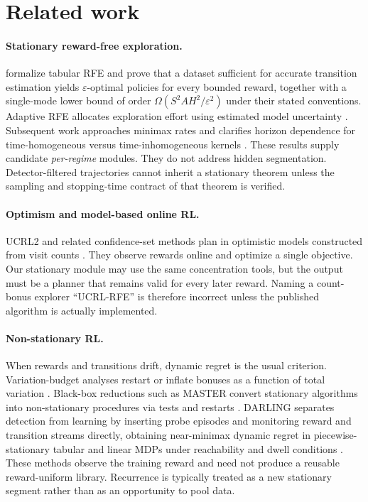 \documentclass[11pt]{article}
\newcommand{\eps}{\varepsilon}
\begin{document}
\section{Related work}
\label{sec:related}

\paragraph{Stationary reward-free exploration.}
\citet{jin2020rewardfree} formalize tabular RFE and prove that a dataset
sufficient for accurate transition estimation yields $\eps$-optimal policies
for every bounded reward, together with a single-mode lower bound of order
$\Omega(S^2AH^2/\eps^2)$ under their stated conventions. Adaptive RFE
allocates exploration effort using estimated model uncertainty
\citep{kaufmann2021adaptive}. Subsequent work approaches minimax rates and
clarifies horizon dependence for time-homogeneous versus time-inhomogeneous
kernels \citep{zhang2021nearly,menard2021fast}. These results supply candidate
\emph{per-regime} modules. They do not address hidden segmentation.
Detector-filtered trajectories cannot inherit a stationary theorem unless the
sampling and stopping-time contract of that theorem is verified.

\paragraph{Optimism and model-based online RL.}
UCRL2 and related confidence-set methods plan in optimistic models constructed
from visit counts \citep{jaksch2010near,azar2017minimax,dann2017unifying}.
They observe rewards online and optimize a single objective. Our stationary
module may use the same concentration tools, but the output must be a planner
that remains valid for every later reward. Naming a count-bonus explorer
``UCRL-RFE'' is therefore incorrect unless the published algorithm is actually
implemented.

\paragraph{Non-stationary RL.}
When rewards and transitions drift, dynamic regret is the usual criterion.
Variation-budget analyses restart or inflate bonuses as a function of total
variation \citep{cheung2020nonstationary,ortner2020variational}. Black-box
reductions such as MASTER convert stationary algorithms into non-stationary
procedures via tests and restarts \citep{wei2021master}. DARLING separates detection from learning by
inserting probe episodes and monitoring reward and transition streams
directly, obtaining near-minimax dynamic regret in piecewise-stationary
tabular and linear MDPs under reachability and dwell conditions
\citep{gerogiannis2026darling}. These methods observe the training reward and
need not produce a reusable reward-uniform library. Recurrence is typically
treated as a new stationary segment rather than as an opportunity to pool
data.
\end{document}
